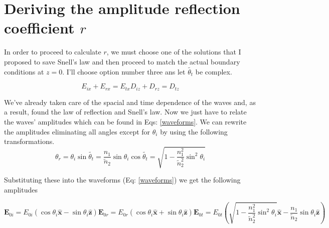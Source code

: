 \documentclass[10pt,a4paper]{article}
\begin{document}
\section{Deriving the amplitude reflection coefficient $r$}
In order to proceed to calculate $r$, we must choose one of the solutions that I proposed to save Snell's law and then proceed to match the actual boundary conditions at $z=0$.  I'll choose option number three ans let $\tilde{\theta_t}$ be complex.

\begin{subequations}\label{BCs}
\begin{equation}\label{E BC}
E_{ix}+E_{rx}=E_{tx}
\end{equation}
\begin{equation}\label{D BC}
D_{iz}+D_{rz}=D_{tz}
\end{equation}
\end{subequations}

We've already taken care of the spacial and time dependence of the waves and, as a result, found the law of reflection and Snell's law.  Now we just have to relate the waves' amplitudes which can be found in Eqs: \ref{waveforms}. We can rewrite the amplitudes eliminating all angles except for $\theta_i$ by using the following transformations.
\begin{subequations}\label{angle transformation}
\begin{equation}\label{theta_r transform}
\theta_r=\theta_i
\end{equation}
\begin{equation}\label{sin theta_t transform}
\sin\tilde{\theta_t}=\frac{n_1}{\tilde{n}_2}\sin\theta_i
\end{equation}
\begin{equation}\label{cos theta_t transform}
\cos\tilde{\theta_t}=\sqrt{1-\frac{n_1^2}{\tilde{n}_2^2}\sin^2\theta_i}
\end{equation}
\end{subequations}

Substituting these into the waveforms (Eq: \ref{waveforms}) we get the following amplitudes

\begin{subequations}\label{amplitudes}
\begin{equation}
\mathbf{E}_{0i}=E_{0i}(\cos\theta_i\mathbf{\hat{x}}-\sin\theta_i\mathbf{\hat{z}})
\end{equation}
\begin{equation}
\mathbf{E}_{0r}=E_{0r}(\cos\theta_i\mathbf{\hat{x}}+\sin\theta_i\mathbf{\hat{z}})
\end{equation}
\begin{equation}
\mathbf{E}_{0t}=E_{0t}(\sqrt{1-\frac{n_1^2}{\tilde{n}_2^2}\sin^2\theta_i}\mathbf{\hat{x}}-\frac{n_1}{\tilde{n}_2}\sin\theta_i\mathbf{\hat{z}})
\end{equation}
\end{subequations}
\end{document}
